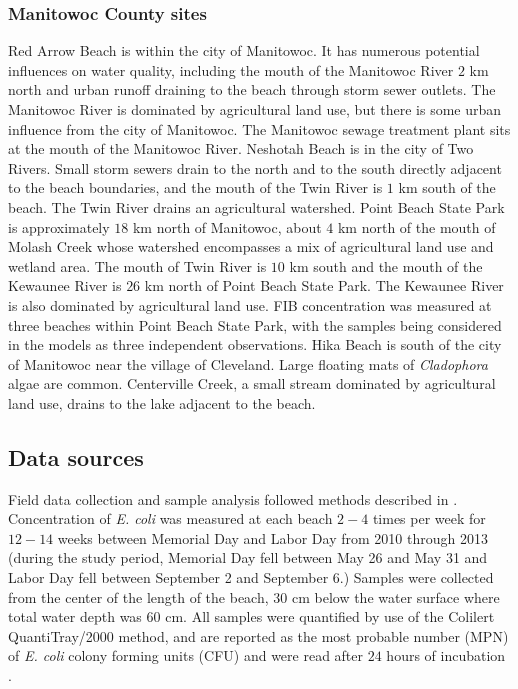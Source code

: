 \documentclass[authoryear,review, 12pt]{elsarticle}
\begin{document}
\subsubsection{Manitowoc County sites}\label{manitowoc-county-sites}

Red Arrow Beach is within the city of Manitowoc. It has numerous
potential influences on water quality, including the mouth of the
Manitowoc River \(2\) km north and urban runoff draining to the beach
through storm sewer outlets. The Manitowoc River is dominated by
agricultural land use, but there is some urban influence from the city
of Manitowoc. The Manitowoc sewage treatment plant sits at the mouth of
the Manitowoc River. Neshotah Beach is in the city of Two
Rivers. Small storm sewers drain to the north and to the south directly
adjacent to the beach boundaries, and the mouth of the Twin River is
\(1\) km south of the beach. The Twin River drains an agricultural
watershed. Point Beach State Park is approximately \(18\) km north of
Manitowoc, about \(4\) km north of the mouth of Molash Creek whose
watershed encompasses a mix of agricultural land use and wetland area.
The mouth of Twin River is \(10\) km south and the mouth of the Kewaunee
River is \(26\) km north of Point Beach State Park. The Kewaunee River
is also dominated by agricultural land use. FIB concentration was
measured at three beaches within Point Beach State Park, with the
samples being considered in the models as three independent
observations. Hika Beach is south of the city of Manitowoc near the
village of Cleveland. Large floating mats of \emph{Cladophora}
algae are common. Centerville Creek, a small stream dominated by
agricultural land use, drains to the lake adjacent to the beach.

\subsection{Data sources}\label{data-sources}

Field data collection and sample analysis followed methods described in
\cite{Francy-et-al-2013}. Concentration of \emph{E. coli} was measured at each
beach \(2-4\) times per week for \(12-14\) weeks between Memorial Day 
and Labor Day from 2010 through 2013 (during the study period, Memorial Day fell between May 26 and May 31 and Labor Day fell between September 2 and September 6.) Samples were collected from the 
center of the length of the beach, \(30\) cm below the water surface
where total water depth was \(60\) cm. All samples were quantified by
use of the Colilert QuantiTray/2000 method, and are reported as the
most probable number (MPN) of \emph{E. coli} colony forming units (CFU)
and were read after \(24\) hours of incubation \citep{Colilert}.
\end{document}
